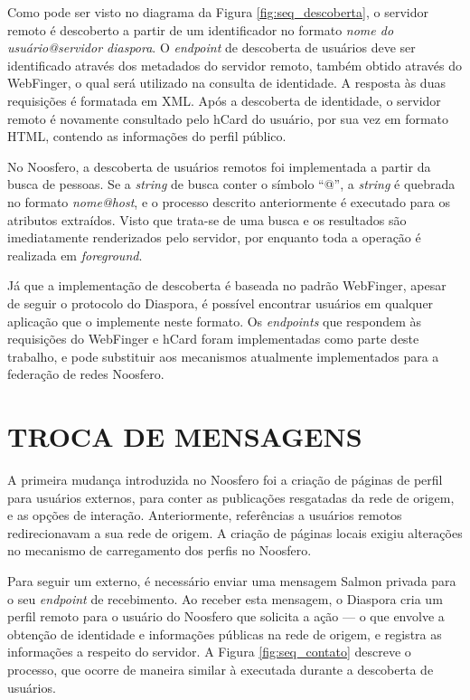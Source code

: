 Como pode ser visto no diagrama da Figura \ref{fig:seq_descoberta}, o servidor
remoto é descoberto a partir de um identificador no formato \textit{nome do
usuário@servidor diaspora}. O \textit{endpoint} de descoberta de usuários deve ser
identificado através dos metadados do servidor remoto, também obtido através do
WebFinger, o qual será utilizado na consulta de identidade. A resposta às duas
requisições é formatada em XML. Após a descoberta de identidade, o servidor remoto é
novamente consultado pelo hCard do usuário, por sua vez em formato HTML, contendo as
informações do perfil público.

No Noosfero, a descoberta de usuários remotos foi implementada a partir da busca de
pessoas. Se a \textit{string} de busca conter o símbolo ``@'', a \textit{string} é
quebrada no formato \textit{nome@host}, e o processo descrito anteriormente é
executado para os atributos extraídos. Visto que trata-se de uma busca e os
resultados são imediatamente renderizados pelo servidor, por enquanto toda a
operação é realizada em \textit{foreground}.

Já que a implementação de descoberta é baseada no padrão WebFinger, apesar de seguir
o protocolo do Diaspora, é possível encontrar usuários em qualquer aplicação que o
implemente neste formato. Os \textit{endpoints} que respondem às requisições do
WebFinger e hCard foram implementadas como parte deste trabalho, e pode substituir
aos mecanismos atualmente implementados para a federação de redes Noosfero.



\section{TROCA DE MENSAGENS}

A primeira mudança introduzida no Noosfero foi a criação de páginas de perfil para
usuários externos, para conter as publicações resgatadas da rede de origem, e as
opções de interação. Anteriormente, referências a usuários remotos redirecionavam a
sua rede de origem. A criação de páginas locais exigiu alterações no mecanismo de
carregamento dos perfis no Noosfero. 

Para seguir um externo, é necessário enviar uma mensagem Salmon privada para o seu
\textit{endpoint} de recebimento. Ao receber esta mensagem, o Diaspora cria um
perfil remoto para o usuário do Noosfero que solicita a ação --- o que envolve a
obtenção de identidade e informações públicas na rede de origem, e registra as
informações a respeito do servidor. A Figura \ref{fig:seq_contato} descreve o
processo, que ocorre de maneira similar à executada durante a descoberta de
usuários.

